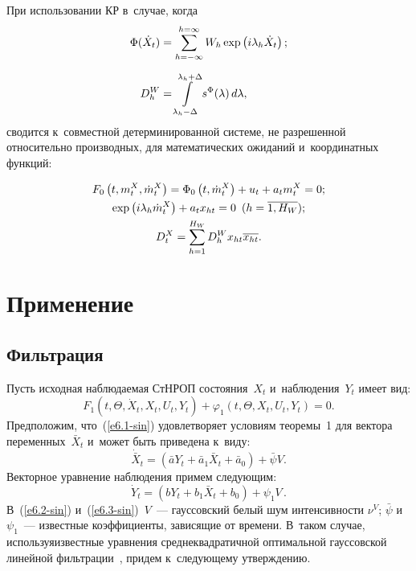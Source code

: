\begin{multicols}{2}
При использовании КР в~случае, когда
 \begin{align*}
    \Phi(\dot X_t)& = \displaystyle \sum\limits_{h=-\infty}^{h=\infty} W_h 
    \exp \left(i\lambda_h \dot X_t\right);\\[6pt]
     D_h^W &=\displaystyle \int\limits_{\lambda_h-\Delta}^{\lambda_h+\Delta} 
    s^\Phi (\lambda)\, d\lambda,
        \end{align*}
сводится к~совместной детерминированной сис\-те\-ме, не разрешенной относительно 
производных, для математических ожиданий и~координатных функций:

\noindent
\begin{gather*}
F_0 \left(t, m_t^X,\dot m_t^X\right) =\Phi_0 \left(t, \dot m_t^X\right) + u_t +a_tm_t^X=0;
    \\  
\exp\left(i\lambda_h \dot m_t^X\right) + a_t x_{ht} =0 \enskip (h=\overline{1, H_W});
    \\
    D_t^X =\sum\limits_{h=1}^{H_W} D_h^W x_{ht}\overline{x_{ht}}.
    \end{gather*}


\section{ Применение }


\subsection{Фильтрация}

Пусть исходная наблюдаемая СтНРОП 
со\-сто\-яния~$X_t$ и~наблюдения~$Y_t$ имеет вид:
\begin{equation}
F_1\!\left(t,\Theta, \dot X_t, X_t, U_t, Y_t\right)\! +\!\varphi_1 \left(t,\Theta, X_t, U_t, Y_t\right)\! =\!0.\!\!
\label{e6.1-sin}
    \end{equation}
Предположим, что~(\ref{e6.1-sin}) удовлетворяет условиям тео\-ре\-мы~1 для вектора переменных~$\bar X_t$ 
и~может быть приведена к~виду:
    \begin{equation}
    \dot{\bar X}_t =\left(\bar a Y_t +\bar a_1 \bar X_t +\bar a_0\right) +\bar \psi V.
    \label{e6.2-sin}
        \end{equation}
Векторное уравнение наблюдения примем сле\-ду\-ющим:
\begin{equation}
\dot Y_t = \left(bY_t+b_1\bar X_t + b_0\right) + \psi_1 V\,.
\label{e6.3-sin}
    \end{equation}
В~(\ref{e6.2-sin}) и~(\ref{e6.3-sin})~$V$~--- 
гауссовский белый шум интенсивности  $\nu^V$; $\bar\psi$ и~$\psi_1$~--- известные коэффициенты, 
зависящие от времени. В~таком случае, используя\linebreak известные уравнения среднеквадратичной 
оптимальной гауссовской линейной фильтрации~\cite{11-sin}, придем к~сле\-ду\-юще\-му утверж\-де\-нию.


\end{multicols}
